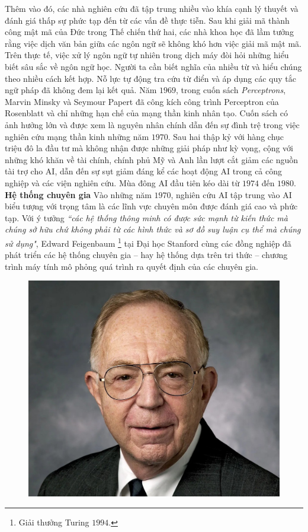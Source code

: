 \begin{multicols}{2}
	\vskip 0.1cm
	Thêm vào đó, các nhà nghiên cứu đã tập trung nhiều vào khía cạnh lý thuyết và đánh giá thấp sự phức tạp đến từ các vấn đề thực tiễn. Sau khi giải mã thành công mật mã của Đức trong Thế chiến thứ hai, các nhà khoa học đã lầm tưởng rằng việc dịch văn bản giữa các ngôn ngữ sẽ không khó hơn việc giải mã mật mã. Trên thực tế, việc xử lý ngôn ngữ tự nhiên trong dịch máy đòi hỏi những hiểu biết sâu sắc về ngôn ngữ học. Người ta cần biết nghĩa của nhiều từ và hiểu chúng theo nhiều cách kết hợp. Nỗ lực tự động tra cứu từ điển và áp dụng các quy tắc ngữ pháp đã không đem lại kết quả. 
	\vskip 0.1cm
	Năm $1969$, trong cuốn sách \textit{Perceptrons}, Marvin Minsky và Seymour Papert đã công kích công trình Perceptron của Rosenblatt và chỉ những hạn chế của mạng thần kinh nhân tạo. Cuốn sách có ảnh hưởng lớn và được xem là nguyên nhân chính dẫn đến sự đình trệ trong việc nghiên cứu mạng thần kinh những năm $1970$.
	\vskip 0.1cm
	Sau hai thập kỷ với hàng chục triệu đô la đầu tư mà không nhận được những giải pháp như kỳ vọng, cộng với những khó khăn về tài chính, chính phủ Mỹ và Anh lần lượt cắt giảm các nguồn tài trợ cho AI, dẫn đến sự sụt giảm đáng kể các hoạt động AI trong cả công nghiệp và các viện nghiên cứu. Mùa đông AI đầu tiên kéo dài từ $1974$ đến $1980$.
	\vskip 0.1cm
	\textbf{\color{timhieukhoahoc}Hệ thống chuyên gia}
	\vskip 0.1cm
	Vào những năm $1970$, nghiên cứu AI tập trung vào AI biểu tượng với trọng tâm là các lĩnh vực chuyên môn được đánh giá cao và phức tạp. Với ý tưởng \textit{``các hệ thống thông minh có được sức mạnh từ kiến thức mà chúng sở hữu chứ không phải từ các hình thức và sơ đồ suy luận cụ thể mà chúng sử dụng"}, Edward Feigenbaum \footnote{\color{timhieukhoahoc}Giải thưởng Turing $1994$.} tại Đại học Stanford cùng các đồng nghiệp đã phát triển các hệ thống chuyên gia -- hay hệ thống dựa trên tri thức -- chương trình máy tính mô phỏng quá trình ra quyết định của các chuyên gia. 
	\begin{figure}[H]
		\vspace*{-5pt}
		\centering
		\captionsetup{labelformat= empty, justification=centering}
		\includegraphics[width= 1\linewidth]{Edward-Feigenbaum.jpeg}

\end{figure}
\end{multicols}
